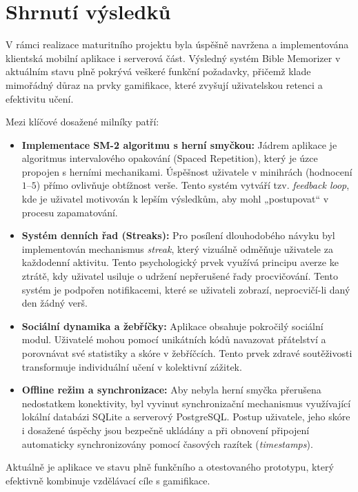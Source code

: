\documentclass[12pt, a4paper, oneside]{article}
\begin{document}
	
	\newpage
	
	\section{Shrnutí výsledků}
	
	V rámci realizace maturitního projektu byla úspěšně navržena a implementována klientská mobilní aplikace i serverová část. Výsledný systém Bible Memorizer v aktuálním stavu plně pokrývá veškeré funkční požadavky, přičemž klade mimořádný důraz na prvky gamifikace, které zvyšují uživatelskou retenci a efektivitu učení.
	
	Mezi klíčové dosažené milníky patří:
	\begin{itemize}
		\item \textbf{Implementace SM-2 algoritmu s herní smyčkou:} Jádrem aplikace je algoritmus intervalového opakování (Spaced Repetition), který je úzce propojen s herními mechanikami. Úspěšnost uživatele v minihrách (hodnocení $1$--$5$) přímo ovlivňuje obtížnost verše. Tento systém vytváří tzv. \textit{feedback loop}, kde je uživatel motivován k lepším výsledkům, aby mohl „postupovat“ v procesu zapamatování.
		\item \textbf{Systém denních řad (Streaks):} Pro posílení dlouhodobého návyku byl implementován mechanismus \textit{streak}, který vizuálně odměňuje uživatele za každodenní aktivitu. Tento psychologický prvek využívá principu averze ke ztrátě, kdy uživatel usiluje o udržení nepřerušené řady procvičování. Tento systém je podpořen notifikacemi, které se uživateli zobrazí, neprocvičí-li daný den žádný verš.
		\item \textbf{Sociální dynamika a žebříčky:} Aplikace obsahuje pokročilý sociální modul. Uživatelé mohou pomocí unikátních kódů navazovat přátelství a porovnávat své statistiky a skóre v žebříčcích. Tento prvek zdravé soutěživosti transformuje individuální učení v kolektivní zážitek.
		\item \textbf{Offline režim a synchronizace:} Aby nebyla herní smyčka přerušena nedostatkem konektivity, byl vyvinut synchronizační mechanismus využívající lokální databázi SQLite a serverový PostgreSQL. Postup uživatele, jeho skóre i dosažené úspěchy jsou bezpečně ukládány a při obnovení připojení automaticky synchronizovány pomocí časových razítek (\textit{timestamps}).
	\end{itemize}
	
	Aktuálně je aplikace ve stavu plně funkčního a otestovaného prototypu, který efektivně kombinuje vzdělávací cíle s gamifikace.
	
\end{document}
